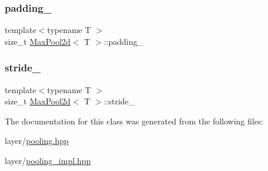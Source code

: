 \subsubsection{\texorpdfstring{padding\_}{padding\_}}
{\footnotesize\ttfamily template$<$typename T $>$ \\
size\+\_\+t \mbox{\hyperlink{class_max_pool2d}{Max\+Pool2d}}$<$ T $>$\+::padding\+\_\+\hspace{0.3cm}{\ttfamily [protected]}}

\mbox{\label{class_max_pool2d_af8701b485ce94e4e3242a22e25350c80}} 
\subsubsection{\texorpdfstring{stride\_}{stride\_}}
{\footnotesize\ttfamily template$<$typename T $>$ \\
size\+\_\+t \mbox{\hyperlink{class_max_pool2d}{Max\+Pool2d}}$<$ T $>$\+::stride\+\_\+\hspace{0.3cm}{\ttfamily [protected]}}



The documentation for this class was generated from the following files\+:\begin{DoxyCompactItemize}
\item 
layer/\mbox{\hyperlink{pooling_8hpp}{pooling.\+hpp}}\item 
layer/\mbox{\hyperlink{pooling__impl_8hpp}{pooling\+\_\+impl.\+hpp}}\end{DoxyCompactItemize}
